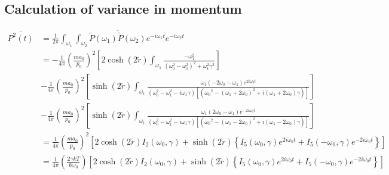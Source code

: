 \documentclass[12pt, twoside]{article}
\begin{document}
\subsection{Calculation of variance in momentum}
$\begin{aligned} \overline{P ^ { 2 } ( t )} &= \frac { 1 } { 2 \pi } \int _ { \omega _ { 1 }}\int_{\omega_2} \overline{\widetilde { P } ( \omega_1 )\widetilde { P } ( \omega_2 )}  e ^ { - i \omega _ { 1 } t } e ^ { - i \omega _ { 2 } t } \\&= -\frac{1}{4\pi}\left(\frac { m a_0 } { p _ { 0 } }\right)^2 \left[ 2 \cosh(2\tilde{r}) \int_{\omega_1} \frac{-\omega_{ 1 }^2}{(\omega_0^2 - \omega_1 ^2)^2 + \omega_1 ^2 \gamma^2}\right] \\&- \frac{1}{4\pi}\left(\frac { m a_0 } { p _ { 0 } }\right)^2 \left[ \sinh(2\tilde{r}) \int_{\omega_1} \frac{\omega_1 (-2\omega_0 - \omega_1)e^{2i\omega_0 t}}{(\omega_0^2 - \omega_1 ^2 - i\omega_1\gamma) [({\omega_0}^2 - (\omega_1 + 2\omega_0)^2 + i(\omega_1 + 2 \omega_0) \gamma)]}\right]
\\&- \frac{1}{4\pi}\left(\frac { m a_0 } { p _ { 0 } }\right)^2 \left[ \sinh(2\tilde{r}) \int_{\omega_1} \frac{\omega_1 (2\omega_0 - \omega_1)e^{-2i\omega_0 t}}{(\omega_0^2 - \omega_1 ^2 - i\omega_1\gamma) [({\omega_0}^2 - (\omega_1 - 2\omega_0)^2 + i(\omega_1 - 2 \omega_0) \gamma)]}\right] \\&= \frac{1}{4\pi}\left(\frac { m a_0 } { p _ { 0 } }\right)^2 \left[2\cosh(2\tilde{r}) I_2(\omega_0,\gamma) + \sinh(2\tilde{r})\left\{I_5(\omega_0,\gamma)e^{2i\omega_0 t}+I_5(-\omega_0,\gamma)e^{-2i\omega_0 t}\right\} \right] 
\\&= \frac{1}{4\pi}\left(\frac {2\gamma k T } { \hbar \omega_0 }\right) \left[2\cosh(2\tilde{r}) I_2(\omega_0,\gamma) + \sinh(2\tilde{r})\left\{I_5(\omega_0,\gamma)e^{2i\omega_0 t}+I_5(-\omega_0,\gamma)e^{-2i\omega_0 t}\right\} \right]\end{aligned}$
\end{document}
